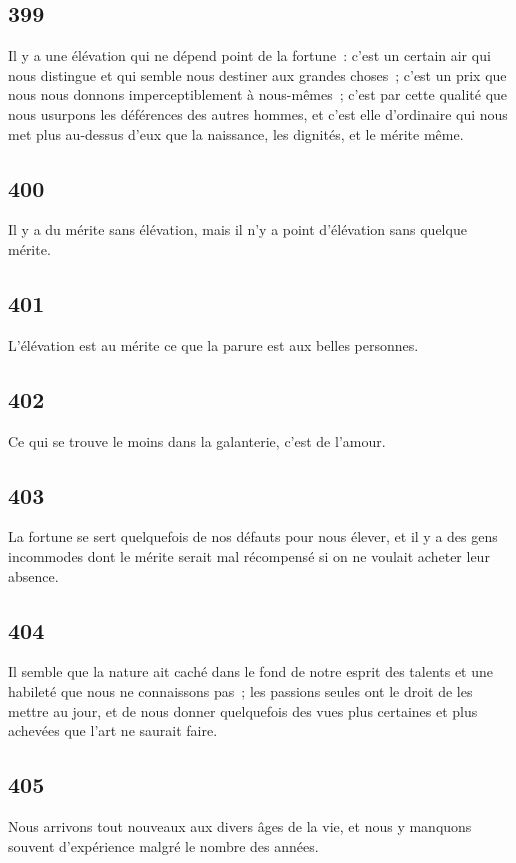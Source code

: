 \documentclass[french,twoside]{book} %
\begin{document}
\subsection[{399}]{ \textsc{399} }
\noindent Il y a une élévation qui ne dépend point de la fortune : c’est un certain air qui nous distingue et qui semble nous destiner aux grandes choses ; c’est un prix que nous nous donnons imperceptiblement à nous-mêmes ; c’est par cette qualité que nous usurpons les déférences des autres hommes, et c’est elle d’ordinaire qui nous met plus au-dessus d’eux que la naissance, les dignités, et le mérite même.
\subsection[{400}]{ \textsc{400} }
\noindent Il y a du mérite sans élévation, mais il n’y a point d’élévation sans quelque mérite.
\subsection[{401}]{ \textsc{401} }
\noindent L’élévation est au mérite ce que la parure est aux belles personnes.
\subsection[{402}]{ \textsc{402} }
\noindent Ce qui se trouve le moins dans la galanterie, c’est de l’amour.
\subsection[{403}]{ \textsc{403} }
\noindent La fortune se sert quelquefois de nos défauts pour nous élever, et il y a des gens incommodes dont le mérite serait mal récompensé si on ne voulait acheter leur absence.
\subsection[{404}]{ \textsc{404} }
\noindent Il semble que la nature ait caché dans le fond de notre esprit des talents et une habileté que nous ne connaissons pas ; les passions seules ont le droit de les mettre au jour, et de nous donner quelquefois des vues plus certaines et plus achevées que l’art ne saurait faire.
\subsection[{405}]{ \textsc{405} }
\noindent Nous arrivons tout nouveaux aux divers âges de la vie, et nous y manquons souvent d’expérience malgré le nombre des années.
\end{document}
